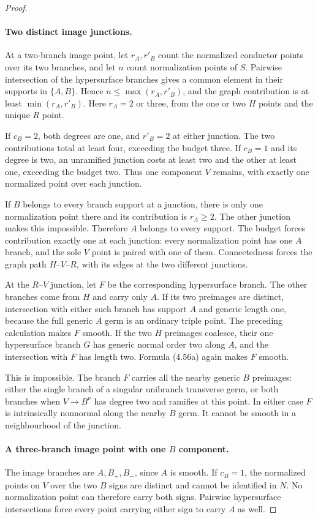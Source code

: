 \begin{proof}
\paragraph{Two distinct image junctions.}
At a two-branch image point, let $r_A,r'_B$ count the
normalized conductor points over its two branches, and
let $n$ count normalization points of $S$. Pairwise
intersection of the hypersurface branches gives a common
element in their supports in $\{A,B\}$. Hence
$n\le\max(r_A,r'_B)$, and the graph contribution is at
least $\min(r_A,r'_B)$. Here $r_A=2$ or three, from the
one or two $H$ points and the unique $R$ point.

If $c_B=2$, both degrees are one, and $r'_B=2$ at either
junction. The two contributions total at least four,
exceeding the budget three. If $c_B=1$ and its degree is
two, an unramified junction costs at least two and the
other at least one, exceeding the budget two. Thus one
component $V$ remains, with exactly one normalized point
over each junction.

If $B$ belongs to every branch support at a junction,
there is only one normalization point there and its
contribution is $r_A\ge2$. The other junction makes this
impossible. Therefore $A$ belongs to every support. The
budget forces contribution exactly one at each junction:
every normalization point has one $A$ branch, and the
sole $V$ point is paired with one of them. Connectedness
forces the graph path $H$--$V$--$R$, with its edges at
the two different junctions.

At the $R$--$V$ junction, let $F$ be the corresponding
hypersurface branch. The other branches come from $H$
and carry only $A$. If its two preimages are distinct,
intersection with either such branch has support $A$ and
generic length one, because the full generic $A$ germ
is an ordinary triple point. The preceding calculation
makes $F$ smooth. If the two $H$ preimages coalesce,
their one hypersurface branch $G$ has generic normal
order two along $A$, and the intersection with $F$ has
length two. Formula (4.56a) again makes $F$ smooth.

This is impossible. The branch $F$ carries all the nearby
generic $B$ preimages: either the single branch of a
singular unibranch transverse germ, or both branches
when $V\to B^\nu$ has degree two and ramifies at this
point. In either case $F$ is intrinsically nonnormal
along the nearby $B$ germ. It cannot be smooth in a
neighbourhood of the junction.

\paragraph{A three-branch image point with one $B$ component.}
The image branches are $A,B_+,B_-$, since $A$ is smooth.
If $c_B=1$, the normalized points on $V$ over the two
$B$ signs are distinct and cannot be identified in $N$.
No normalization point can therefore carry both signs.
Pairwise hypersurface intersections force every point
carrying either sign to carry $A$ as well.


\end{proof}

